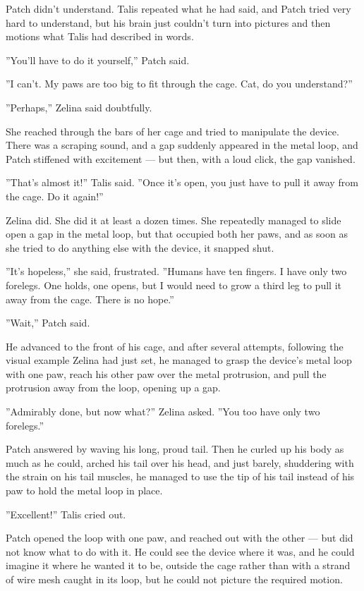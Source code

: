 \documentclass[12pt]{book}
\begin{document}
Patch didn't understand. Talis repeated what he had said, and Patch tried very hard to understand, but his brain just couldn't turn into pictures and then motions what Talis had described in words.

''You'll have to do it yourself,'' Patch said.

''I can't. My paws are too big to fit through the cage. Cat, do you understand?''

''Perhaps,'' Zelina said doubtfully.

She reached through the bars of her cage and tried to manipulate the device. There was a scraping sound, and a gap suddenly appeared in the metal loop, and Patch stiffened with excitement ---
but then, with a loud click, the gap vanished.

''That's almost it!'' Talis said. ''Once it's open, you just have to pull it away from the cage. Do it again!''

Zelina did. She did it at least a dozen times. She repeatedly managed to slide open a gap in the metal loop, but that occupied both her paws, and as soon as she tried to do anything else with the device, it snapped shut.

''It's hopeless,'' she said, frustrated. ''Humans have ten fingers. I have only two forelegs. One holds, one opens, but I would need to grow a third leg to pull it away from the cage. There is no hope.''

''Wait,'' Patch said.

He advanced to the front of his cage, and after several attempts, following the visual example Zelina had just set, he managed to grasp the device's metal loop with one paw, reach his other paw over the metal protrusion, and pull the protrusion away from the loop, opening up a gap.

''Admirably done, but now what?'' Zelina asked. ''You too have only two forelegs.''

Patch answered by waving his long, proud tail. Then he curled up his body as much as he could, arched his tail over his head, and just barely, shuddering with the strain on his tail muscles, he managed to use the tip of his tail instead of his paw to hold the metal loop in place.

''Excellent!'' Talis cried out.

Patch opened the loop with one paw, and reached out with the other ---
but did not know what to do with it. He could see the device where it was, and he could imagine it where he wanted it to be, outside the cage rather than with a strand of wire mesh caught in its loop, but he could not picture the required motion.
\end{document}
